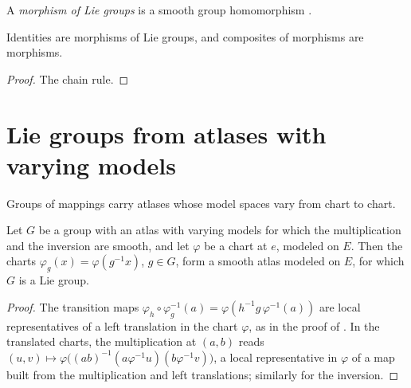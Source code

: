 \begin{definition}[Morphisms]
  \label{def:lie-hom}
  \leanok
  A \emph{morphism of Lie groups} is a smooth group homomorphism \cite[Definition
  5.1.1(c)]{GN26}.
\end{definition}

\begin{proposition}
  \label{prop:lie-hom-cat}
  \leanok
  Identities are morphisms of Lie groups, and composites of morphisms are morphisms.
\end{proposition}

\begin{proof}
  \leanok
  The chain rule.
\end{proof}

\section{Lie groups from atlases with varying models}

Groups of mappings carry atlases whose model spaces vary from chart to chart.

\begin{theorem}
  \label{thm:of-varying-atlas}
  \leanok
  Let $G$ be a group with an atlas with varying models for which the multiplication and the
  inversion are smooth, and let $\varphi$ be a chart at $e$, modeled on $E$. Then the charts
  $\varphi_g(x) = \varphi(g^{-1}x)$, $g \in G$, form a smooth atlas modeled on $E$, for which $G$ is
  a Lie group.
\end{theorem}

\begin{proof}
  \leanok
  The transition maps $\varphi_h \circ \varphi_g^{-1}(a) = \varphi(h^{-1}g\,\varphi^{-1}(a))$ are local
  representatives of a left translation in the chart $\varphi$, as in the proof of
  \cite[Theorem 5.3.1]{GN26}. In the translated charts, the multiplication at $(a, b)$ reads
  $(u, v) \mapsto \varphi\big((ab)^{-1}(a\varphi^{-1}u)(b\varphi^{-1}v)\big)$, a local representative
  in $\varphi$ of a map built from the multiplication and left translations; similarly for the
  inversion.
\end{proof}

